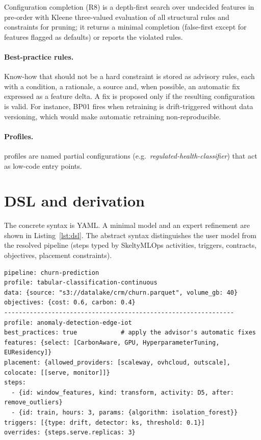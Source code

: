 \documentclass[10pt,a4paper]{article}
\begin{document}
Configuration completion (R8) is a depth-first search over undecided features in
pre-order with Kleene three-valued evaluation of all structural rules and
constraints for pruning; it returns a minimal completion (false-first except for
features flagged as defaults) or reports the violated rules.

\paragraph{Best-practice rules.} Know-how that should not be a hard constraint is
stored as \NRules{} advisory rules, each with a condition, a rationale, a source
and, when possible, an automatic fix expressed as a feature delta. A fix is
proposed only if the resulting configuration is valid. For instance, BP01 fires
when retraining is drift-triggered without data versioning, which would make
automatic retraining non-reproducible.

\paragraph{Profiles.} \NProfiles{} profiles are named partial configurations (e.g.\
\emph{regulated-health-classifier}) that act as low-code entry points.

\section{DSL and derivation}
The concrete syntax is YAML. A minimal model and an expert refinement are shown in
Listing~\ref{lst:dsl}. The abstract syntax distinguishes the user model from the
resolved pipeline (steps typed by SkeltyMLOps activities, triggers, contracts,
objectives, placement constraints).

\begin{lstlisting}[style=yaml,caption={Non-expert model (top) and excerpt of an expert model (bottom).},label=lst:dsl]
pipeline: churn-prediction
profile: tabular-classification-continuous
data: {source: "s3://datalake/crm/churn.parquet", volume_gb: 40}
objectives: {cost: 0.6, carbon: 0.4}
---------------------------------------------------------------
profile: anomaly-detection-edge-iot
best_practices: true            # apply the advisor's automatic fixes
features: {select: [CarbonAware, GPU, HyperparameterTuning, EUResidency]}
placement: {allowed_providers: [scaleway, ovhcloud, outscale], colocate: [[serve, monitor]]}
steps:
  - {id: window_features, kind: transform, activity: D5, after: remove_outliers}
  - {id: train, hours: 3, params: {algorithm: isolation_forest}}
triggers: [{type: drift, detector: ks, threshold: 0.1}]
overrides: {steps.serve.replicas: 3}
\end{lstlisting}
\end{document}
